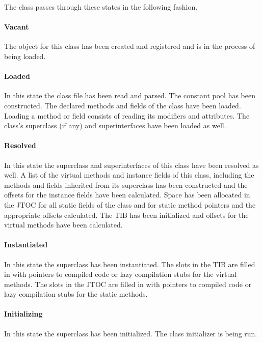 The class passes through these states in the following fashion.

\paragraph{Vacant}
The 
object for this class has been created and registered and is in the
process of being loaded.

\paragraph{Loaded} 
In this state the class file has been read and parsed.  The constant
pool has been constructed. The declared methods and fields of the
class have been loaded.  Loading a method or field consists of reading
its modifiers and attributes. The class's superclass (if any) and
superinterfaces have been loaded as well.

\paragraph{Resolved}
In this state the superclass and superinterfaces of this class have
been resolved as well.  A list of the virtual methods and instance fields
of this class, including the methods and fields inherited from its
superclass has been constructed and the offsets for the instance
fields have been calculated.  Space has been allocated in the JTOC for
all static fields of the class and for static method pointers and the
appropriate offsets calculated.  The TIB has been initialized and
offsets for the virtual methods have been calculated.

\paragraph{Instantiated}
In this state the superclass has been instantiated.  The
slots in the TIB are filled in with pointers to compiled code or lazy
compilation stubs for
the virtual methods.  The slots in the JTOC are filled in with
pointers to compiled code or lazy compilation stubs for the static methods.

\paragraph{Initializing} 
In this state the superclass has been initialized. The class
initializer is being run. 

